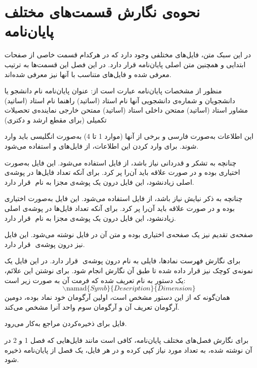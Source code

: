 \chapter{نحوه‌ی نگارش قسمت‌های مختلف پایان‌نامه}

در این سبک متن، فایل‌های مختلفی وجود دارد که 
در هرکدام قسمت خاصی از صفحات ابتدایی و همچنین متن اصلی پایان‌نامه قرار دارد.
در این فصل این قسمت‌ها به ترتیب معرفی شده و فایل‌های متناسب با آنها نیز معرفی شده‌اند.

منظور از مشخصات پایان‌نامه عبارت است از:
 عنوان پایان‌نامه
 نام دانشجو یا دانشجویان و شماره‌ی دانشجویی ‌آنها
 نام استاد (اساتید) راهنما
 نام استاد (اساتید)  مشاور
 استاد (اساتید) ممتحن داخلی
 استاد (اساتید) ممتحن خارجی
 نماینده‌ی تحصیلات تکمیلی (برای مقطع ارشد و دکتری)

این اطلاعات به‌صورت فارسی و برخی از آنها (موارد 1 تا 4) به‌صورت انگلیسی باید وارد شوند.
برای وارد کردن این اطلاعات، از فایل‌های   و   استفاده می‌شود.

چنانچه به تشکر و قدردانی نیاز باشد، از فایل  استفاده می‌شود.
این فایل به‌صورت اختیاری بوده و در صورت علاقه باید آن‌را پر کرد.
برای آنکه تعداد فایل‌ها در پوشه‌ی اصلی زیادنشود، این فایل  درون یک پوشه‌ی مجزا به 
نام ‌ قرار دارد.


چنانچه به ذکر نیایش نیاز باشد، از فایل  استفاده می‌شود.
این فایل به‌صورت اختیاری بوده و در صورت علاقه باید آن‌را پر کرد.
برای آنکه تعداد فایل‌ها در پوشه‌ی اصلی زیادنشود، این فایل  درون یک پوشه‌ی مجزا به 
نام ‌ قرار دارد.

صفحه‌ی تقدیم نیز یک صفحه‌ی اختیاری بوده و متن آن در فایل   
نوشته می‌شود.
 این فایل نیز  درون پوشه‌ی  ‌ قرار دارد.


برای نگارش فهرست نمادها، فایلی به نام    
 درون پوشه‌ی  ‌ قرار دارد. در این فایل یک نمونه‌ی کوچک نیز قرار داده شده
تا طبق آن نگارش انجام شود. برای نوشتن این علائم، یک دستور به نام   تعریف
شده که فرمت آن به صورت زیر است:
\[
\backslash \text{namad}\{Symb\}\{Description\}\{Dimension\}
\]
همان‌گونه که از این دستور مشخص است، اولین آرگومان خود 
نماد بوده، دومین آرگومان تعریف آن و آرگومان سوم واحد آنرا مشخص می‌کند.




فایل   برای ذخیره‌کردن مراجع به‌کار می‌رود. 



برای نگارش فصل‌های مختلف پایان‌نامه، کافی است مانند  فایل‌هایی که فصل 1 و 2
در آن نوشته شده، به تعداد مورد نیاز کپی کرده و در هر فایل، یک فصل از پایان‌نامه
ذخیره شود.








